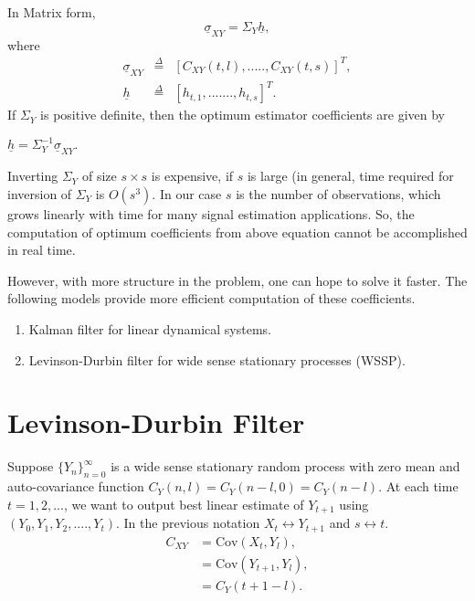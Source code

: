 \documentclass[a4paper,english,12pt]{article}
\begin{document}
In Matrix form,
\begin{equation}
\underline{\sigma}_{XY} = \Sigma_Y \underline{h} \nonumber,
\end{equation} 
where
\begin{eqnarray}
\underline{\sigma}_{XY} & \overset{\Delta}{=} & [C_{XY}(t,l),.....,C_{XY}(t,s)]^T,\nonumber \\
\underline{h} & \overset{\Delta}{=} & [h_{t,1},.......,h_{t,s}]^T. \nonumber
\end{eqnarray}
If $\Sigma_{Y}$ is positive definite, then the optimum estimator coefficients are given by
\begin{center}
$\underline{h} =  \Sigma_{Y}^{-1}\underline{\sigma}_{XY}.$
\end{center}
\begin{note}
Inverting $\Sigma_Y$ of size $s \times s$ is expensive, if $s$ is large (in general, time required for inversion of $\Sigma_{Y}$ is $O(s^3)$. In our case $s$ is the number of observations, which grows linearly with time for many signal estimation applications. So, the computation of optimum coefficients from above equation cannot be accomplished in real time.
\end{note}
\par However, with more structure in the problem, one can hope to solve it faster.
The following models provide more efficient computation of these coefficients.
\begin{enumerate}
\item Kalman filter for linear dynamical systems.
\item Levinson-Durbin filter for wide sense stationary processes (WSSP).
\end{enumerate}
\section{Levinson-Durbin Filter}
Suppose $\{Y_n\}_{n=0}^\infty$ is a wide sense stationary random process with zero mean and auto-covariance function $C_Y(n,l)=C_Y(n-l,0)=C_Y(n-l)$. At each time $t=1,2,...$, we want to output best linear estimate of $Y_{t+1}$ using $(Y_0,Y_1,Y_2,....,Y_t)$. In the previous notation $X_t \leftrightarrow Y_{t+1}$ and $s \leftrightarrow t$.
\begin{align}
C_{XY}&=\text{Cov}(X_t,Y_l), \nonumber\\
&=\text{Cov}(Y_{t+1},Y_l), \nonumber\\
&=C_Y(t+1-l). \nonumber
\end{align}
\end{document}
